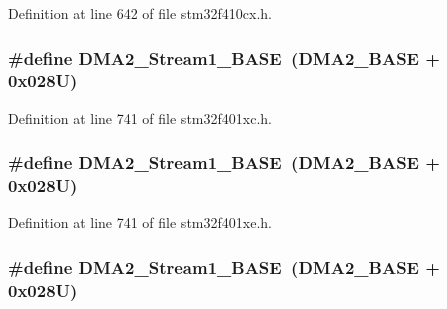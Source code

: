 Definition at line 642 of file stm32f410cx.\+h.

\subsubsection[{\texorpdfstring{D\+M\+A2\+\_\+\+Stream1\+\_\+\+B\+A\+SE}{DMA2_Stream1_BASE}}]{\setlength{\rightskip}{0pt plus 5cm}\#define D\+M\+A2\+\_\+\+Stream1\+\_\+\+B\+A\+SE~({\bf D\+M\+A2\+\_\+\+B\+A\+SE} + 0x028\+U)}\hypertarget{group___peripheral__registers__structures_ga35512bdc3f5e9df4557c2fbe7935d0b1}{}\label{group___peripheral__registers__structures_ga35512bdc3f5e9df4557c2fbe7935d0b1}


Definition at line 741 of file stm32f401xc.\+h.

\subsubsection[{\texorpdfstring{D\+M\+A2\+\_\+\+Stream1\+\_\+\+B\+A\+SE}{DMA2_Stream1_BASE}}]{\setlength{\rightskip}{0pt plus 5cm}\#define D\+M\+A2\+\_\+\+Stream1\+\_\+\+B\+A\+SE~({\bf D\+M\+A2\+\_\+\+B\+A\+SE} + 0x028\+U)}\hypertarget{group___peripheral__registers__structures_ga35512bdc3f5e9df4557c2fbe7935d0b1}{}\label{group___peripheral__registers__structures_ga35512bdc3f5e9df4557c2fbe7935d0b1}


Definition at line 741 of file stm32f401xe.\+h.

\subsubsection[{\texorpdfstring{D\+M\+A2\+\_\+\+Stream1\+\_\+\+B\+A\+SE}{DMA2_Stream1_BASE}}]{\setlength{\rightskip}{0pt plus 5cm}\#define D\+M\+A2\+\_\+\+Stream1\+\_\+\+B\+A\+SE~({\bf D\+M\+A2\+\_\+\+B\+A\+SE} + 0x028\+U)}\hypertarget{group___peripheral__registers__structures_ga35512bdc3f5e9df4557c2fbe7935d0b1}{}\label{group___peripheral__registers__structures_ga35512bdc3f5e9df4557c2fbe7935d0b1}


